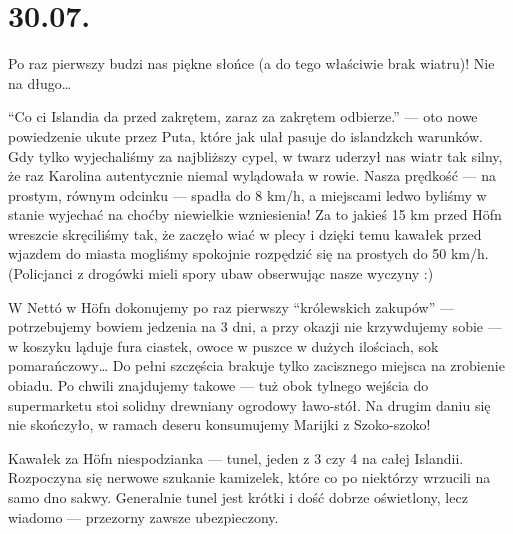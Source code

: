\chapter*{30.07.}

Po raz pierwszy budzi nas piękne słońce (a do tego właściwie brak wiatru)! Nie na długo…

“Co ci Islandia da przed zakrętem, zaraz za zakrętem odbierze.” --- oto nowe powiedzenie ukute przez Puta, które jak ulał pasuje do islandzkch warunków. Gdy tylko wyjechaliśmy za najbliższy cypel, w twarz uderzył nas wiatr tak silny, że raz Karolina autentycznie niemal wylądowała w rowie. Nasza prędkość --- na prostym, równym odcinku --- spadła do 8 km/h, a miejscami ledwo byliśmy w stanie wyjechać na choćby niewielkie wzniesienia! Za to jakieś 15 km przed Höfn wreszcie skręciliśmy tak, że zaczęło wiać w plecy i dzięki temu kawałek przed wjazdem do miasta mogliśmy spokojnie rozpędzić się na prostych do 50 km/h. (Policjanci z drogówki mieli spory ubaw obserwując nasze wyczyny :)



W Nettó w Höfn dokonujemy po raz pierwszy “królewskich zakupów” --- potrzebujemy bowiem jedzenia na 3 dni, a przy okazji nie krzywdujemy sobie --- w koszyku ląduje fura ciastek, owoce w puszce w dużych ilościach, sok pomarańczowy… Do pełni szczęścia brakuje tylko zacisznego miejsca na zrobienie obiadu. Po chwili znajdujemy takowe --- tuż obok tylnego wejścia do supermarketu stoi solidny drewniany ogrodowy ławo-stół. Na drugim daniu się nie skończyło, w ramach deseru konsumujemy Marijki z Szoko-szoko!


Kawałek za Höfn niespodzianka --- tunel, jeden z 3 czy 4 na całej Islandii. Rozpoczyna się nerwowe szukanie kamizelek, które co po niektórzy wrzucili na samo dno sakwy. Generalnie tunel jest krótki i dość dobrze oświetlony, lecz wiadomo --- przezorny zawsze ubezpieczony.

